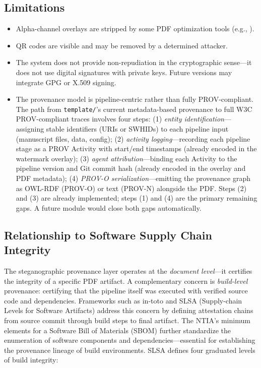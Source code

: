 \documentclass[
]{article}
\providecommand{\tightlist}{%
  \setlength{\itemsep}{0pt}\setlength{\parskip}{0pt}}
\begin{document}
\subsection{Limitations}\label{limitations-1}

\begin{itemize}
\tightlist
\item
  Alpha-channel overlays are stripped by some PDF optimization tools
  (e.g., ).
\item
  QR codes are visible and may be removed by a determined attacker.
\item
  The system does not provide non-repudiation in the cryptographic
  sense---it does not use digital signatures with private keys. Future
  versions may integrate GPG or X.509 signing.
\item
  The provenance model is pipeline-centric rather than fully
  PROV-compliant. The path from \texttt{template/}'s current
  metadata-based provenance to full W3C PROV-compliant traces involves
  four steps: (1) \emph{entity identification}---assigning stable
  identifiers (URIs or SWHIDs) to each pipeline input (manuscript files,
  data, config); (2) \emph{activity logging}---recording each pipeline
  stage as a PROV Activity with start/end timestamps (already encoded in
  the watermark overlay); (3) \emph{agent attribution}---binding each
  Activity to the pipeline version and Git commit hash (already encoded
  in the overlay and PDF metadata); (4) \emph{PROV-O
  serialization}---emitting the provenance graph as OWL-RDF (PROV-O) or
  text (PROV-N) alongside the PDF. Steps (2) and (3) are already
  implemented; steps (1) and (4) are the primary remaining gaps. A
  future  module would close both gaps
  automatically.
\end{itemize}

\subsection{Relationship to Software Supply Chain
Integrity}\label{relationship-to-software-supply-chain-integrity}

The steganographic provenance layer operates at the \emph{document
level}---it certifies the integrity of a specific PDF artifact. A
complementary concern is \emph{build-level} provenance: certifying that
the pipeline itself was executed with verified source code and
dependencies. Frameworks such as in-toto \citep{torresarias2019intoto}
and SLSA (Supply-chain Levels for Software Artifacts) address this
concern by defining attestation chains from source commit through build
steps to final artifact. The NTIA's minimum elements for a Software Bill
of Materials (SBOM) \citep{ntia2021sbom} further standardize the
enumeration of software components and dependencies---essential for
establishing the provenance lineage of build environments. SLSA defines
four graduated levels of build integrity:
\end{document}
